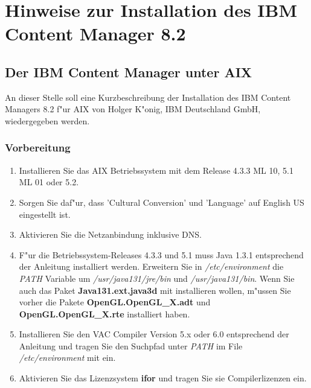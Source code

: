 %
%
\section{Hinweise zur Installation des IBM Content Manager 8.2}
%
%
\subsection{Der IBM Content Manager unter AIX}
An dieser Stelle soll eine Kurzbeschreibung der Installation des IBM Content Managers 8.2 f"ur AIX von Holger K"onig, IBM Deutschland GmbH, wiedergegeben werden. \\[2ex]
\subsubsection{Vorbereitung}
\begin{enumerate}
\item Installieren Sie das AIX Betriebssystem mit dem Release 4.3.3 ML 10, 5.1 ML 01 oder 5.2.
\item Sorgen Sie daf"ur, dass 'Cultural Conversion' und 'Language' auf English US eingestellt ist.
\item Aktivieren Sie die Netzanbindung inklusive DNS.
\item F"ur die Betriebssystem-Releases 4.3.3 und 5.1 muss Java 1.3.1 entsprechend der Anleitung installiert werden. Erweitern Sie in {\it /etc/environment }  die {\it PATH} Variable um {\it /usr/java131/jre/bin} und {\it /usr/java131/bin}. Wenn Sie auch das Paket {\bf Java131.ext.java3d } mit installieren wollen, m"ussen Sie vorher die Pakete {\bf OpenGL.OpenGL\_X.adt} und {\bf OpenGL.OpenGL\_X.rte} installiert haben.
\item Installieren Sie den VAC Compiler Version 5.x oder 6.0 entsprechend der Anleitung und tragen Sie den Suchpfad unter {\it PATH} im File {\it /etc/environment } mit ein.
\item Aktivieren Sie das Lizenzsystem {\bf ifor} und tragen Sie sie Compilerlizenzen ein.
\end{enumerate}
%
